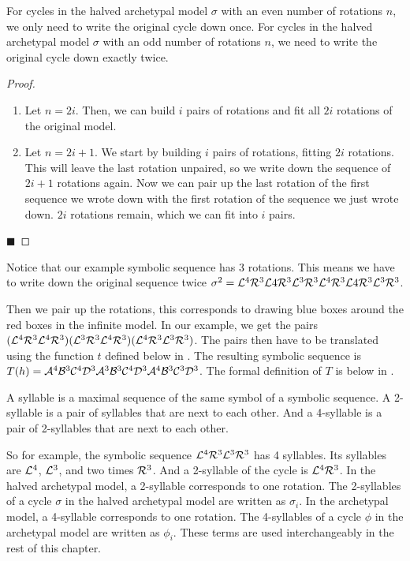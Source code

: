 \begin{lemma}
	\label{lemma:writing.down}
	For cycles in the halved archetypal model $\sigma$ with an even number of rotations $n$, we only need to write the original cycle down once.
	For cycles in the halved archetypal model $\sigma$ with an odd number of rotations $n$, we need to write the original cycle down exactly twice.
\end{lemma}

\clearpage

\begin{proof} \phantom{x}
	\begin{enumerate}
		\item Let $n = 2i$. Then, we can build $i$ pairs of rotations and fit all $2i$ rotations of the original model.
		\item Let $n = 2i + 1$. We start by building $i$ pairs of rotations, fitting $2i$ rotations.
		      This will leave the last rotation unpaired, so we write down the sequence of $2i + 1$ rotations again.
		      Now we can pair up the last rotation of the first sequence we wrote down with the first rotation of the sequence we just wrote down.
		      $2i$ rotations remain, which we can fit into $i$ pairs.
	\end{enumerate}
	\hfill $\blacksquare$
\end{proof}

Notice that our example symbolic sequence has 3 rotations.
This means we have to write down the original sequence twice $\sigma^2 = \mathcal{L}^4\mathcal{R}^3\mathcal{L}4\mathcal{R}^3\mathcal{L}^3\mathcal{R}^3\mathcal{L}^4\mathcal{R}^3\mathcal{L}4\mathcal{R}^3\mathcal{L}^3\mathcal{R}^3$.

Then we pair up the rotations, this corresponds to drawing blue boxes around the red boxes in the infinite model.
In our example, we get the pairs $(\mathcal{L}^4\mathcal{R}^3\mathcal{L}^4\mathcal{R}^3)(\mathcal{L}^3\mathcal{R}^3\mathcal{L}^4\mathcal{R}^3)(\mathcal{L}^4\mathcal{R}^3\mathcal{L}^3\mathcal{R}^3)$.
The pairs then have to be translated using the function $t$ defined below in .
The resulting symbolic sequence is $T(h) = \mathcal{A}^4\mathcal{B}^3\mathcal{C}^4\mathcal{D}^3\mathcal{A}^3\mathcal{B}^3\mathcal{C}^4\mathcal{D}^3\mathcal{A}^4\mathcal{B}^3\mathcal{C}^3\mathcal{D}^3$.
The formal definition of $T$ is below in .

\begin{definition}[Syllables]
	A syllable is a maximal sequence of the same symbol of a symbolic sequence.
	A 2-syllable is a pair of syllables that are next to each other.
	And a 4-syllable is a pair of 2-syllables that are next to each other.
\end{definition}

So for example, the symbolic sequence $\mathcal{L}^4\mathcal{R}^3\mathcal{L}^3\mathcal{R}^3$ has 4 syllables.
Its syllables are $\mathcal{L}^4$, $\mathcal{L}^3$, and two times $\mathcal{R}^3$.
And a 2-syllable of the cycle is $\mathcal{L}^4\mathcal{R}^3$.
In the halved archetypal model, a 2-syllable corresponds to one rotation.
The 2-syllables of a cycle $\sigma$ in the halved archetypal model are written as $\sigma_i$.
In the archetypal model, a 4-syllable corresponds to one rotation.
The 4-syllables of a cycle $\phi$ in the archetypal model are written as $\phi_i$.
These terms are used interchangeably in the rest of this chapter.

